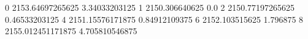 0 2153.64697265625 3.34033203125
1 2150.306640625 0.0
2 2150.77197265625 0.46533203125
4 2151.15576171875 0.84912109375
6 2152.103515625 1.796875
8 2155.012451171875 4.705810546875
